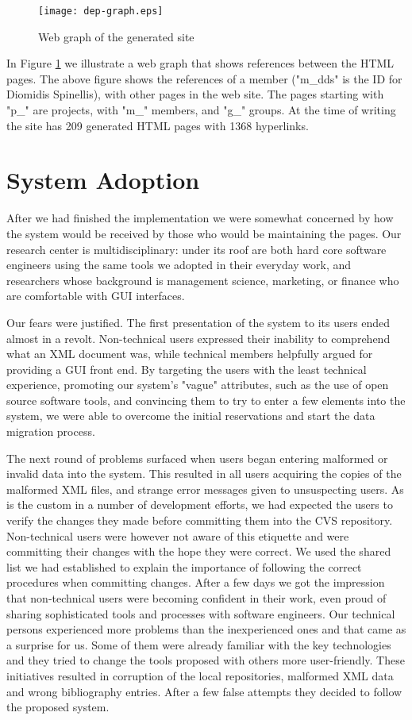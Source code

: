 \documentclass[10pt]{article}
\begin{document}
\begin{figure}
\texttt{[image: dep-graph.eps]}
\caption{Web graph of the generated site}
\label{fig:eltrun-web-m-dds-snapshot}
\end{figure}

In Figure \ref{fig:eltrun-web-m-dds-snapshot} we illustrate a web graph \cite{KRRSTU00} 
that shows references between the {\sc HTML} pages.
The above figure shows the references  of a member ("m\_dds" is the ID for 
Diomidis Spinellis), with other pages in the web site.
The pages starting with "p\_" are projects, with "m\_" members, and "g\_" groups.
At the time of writing the site has 209 generated {\sc HTML} pages with 1368 hyperlinks. 

\section{System Adoption}
\label{sec:adopt}
After we had finished the implementation we were somewhat concerned
by how the system would be received by those who would be
maintaining the pages.
Our research center is multidisciplinary: under its roof
are both hard core software engineers using the same tools
we adopted in their everyday work, and researchers whose
background is management science, marketing, or finance
who are comfortable with {\sc GUI} interfaces.

Our fears were justified.
The first presentation of the system to its users ended
almost in a revolt.
Non-technical users expressed their inability to comprehend
what an {\sc XML} document was, while technical members
helpfully argued for providing a {\sc GUI} front end.
By targeting the users with the least technical experience,
promoting our system's "vague" attributes,
such as the use of open source software tools,
and convincing them to try to enter a few elements into
the system, we were able to overcome the initial reservations
and start the data migration process.

The next round of problems surfaced when users began entering
malformed or invalid data into the system.
This resulted in all users acquiring the copies of the malformed
{\sc XML} files, and strange error messages given to unsuspecting
users.
As is the custom in a number of development efforts, we had
expected the users to verify the changes they made before
committing them into the {\sc CVS} repository.
Non-technical users were however not aware of this etiquette
and were committing their changes with the hope they were correct.
We used the shared list we had established to explain the
importance of following the correct procedures when committing changes.
After a few days we got the impression that non-technical users
were becoming confident in their work, even proud of sharing
sophisticated tools and processes with software engineers.
Our technical persons experienced more problems than the inexperienced ones 
and that came as a surprise for us. Some of them were already familiar 
with the key technologies and they tried to change the tools proposed with others 
more user-friendly. 
These initiatives resulted in corruption of the local repositories, malformed 
{\sc XML} data and wrong bibliography entries.
After a few false attempts they decided to follow the proposed system.
\end{document}

